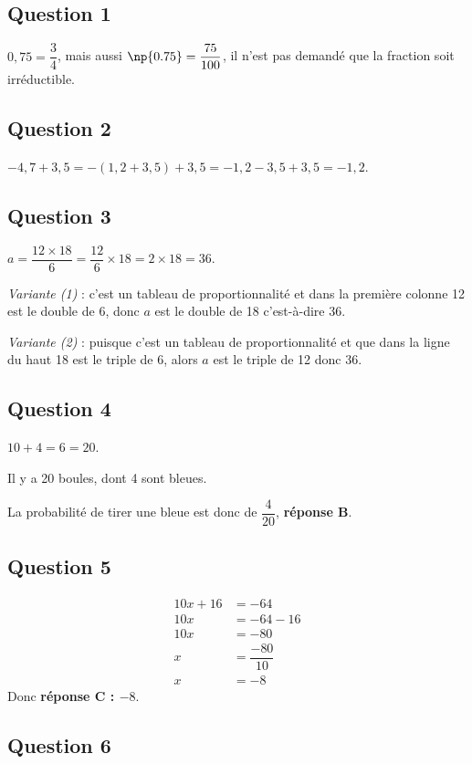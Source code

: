 \subsection*{Question 1}


$0,75=\dfrac{3}{4}$, mais aussi \mbox{$\np{0.75}=\dfrac{75}{100}$}, il n'est pas demandé que la fraction soit irréductible.

\subsection*{Question 2}

$-4,7+3,5=-(1,2+3,5)+3,5=-1,2-3,5+3,5=-1,2$.
\subsection*{Question 3}


$a=\dfrac{12\times 18}{6}=\dfrac{12}{6}\times 18=2\times 18 =36$.

\textit{Variante (1)} : c'est un tableau de proportionnalité et dans la première colonne 12 est le double de 6, donc $a$ est le double de 18 c'est-à-dire 36.

\textit{Variante (2)} : puisque c'est un tableau de proportionnalité et que dans la ligne du haut 18 est le triple de 6, alors $a$ est le triple de 12 donc 36.
\subsection*{Question 4}


$10+4=6=20$.

Il y a 20 boules, dont 4 sont bleues.

La probabilité de tirer une bleue est donc de $\dfrac{4}{20}$,  \textbf{réponse B}.

\subsection*{Question 5}

\begin{align*}
10 x+16&=-64\\
10x&=-64-16\\
10x &=-80\\
x&=\dfrac{-80}{10}\\
x&=-8
\end{align*}
 Donc \textbf{réponse C : $-8$}.

\subsection*{Question 6}

